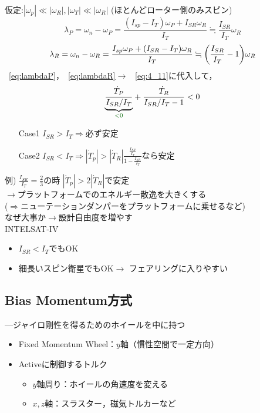 \documentclass[class=article, crop=false, dvipdfmx]{standalone}
\begin{document}
仮定:$|\omega_p|\ll|\omega_R|,|\omega_T|\ll|\omega_R|$
(ほとんどローター側のみスピン)
\begin{equation}
\lambda_P = \omega_n - \omega_P = \frac{(I_{sp} - I_T)\omega_P + I_{SR} \omega_R}{I_T}
	\fallingdotseq \frac{I_{SR}}{I_T} \omega_R
    \label{eq:lambdaP}
\end{equation}
\begin{equation}
\lambda_R = \omega_n - \omega_R = \frac{I_{sp} \omega_P + (I_{SR} - I_T) \omega_R}{I_T}
	\fallingdotseq \qty(\frac{I_{SR}}{I_T} - 1) \omega_R
    \label{eq:lambdaR}
\end{equation}
~\eqref{eq:lambdaP}，~\eqref{eq:lambdaR}$\rightarrow$ ~\eqref{eq:4_11}に代入して，
\begin{equation}
\underexpl{\dfrac{\dot{T}_P}{I_{SR}/I_T}}{\textcolor{darkgreen}{<0}} + \dfrac{\dot{T}_R}{I_{SR}/I_T - 1} < 0
\label{eq:Tdot-relation}
\end{equation}
\begin{itemize}
\item [Case1] $I_{SR}>I_T\Rightarrow$必ず安定
\item [Case2] $I_{SR}<I_{T}
\Rightarrow|\dot{T}_p|>|\dot{T}_R|
\frac{\frac{I_{SR}}{I_T}}{1-\frac{I_{SR}}{I_T}}$なら安定
\end{itemize}
例)
$\frac{I_{SR}}{I_T}=\frac{2}{3}$の時
\qquad
$|\dot{T}_p|>2|\dot{T}_R|$で安定\\
$\rightarrow$プラットフォームでのエネルギー散逸を大きくする\\
($\Rightarrow$ニューテーションダンパーをプラットフォームに乗せるなど)\\
なぜ大事か$\rightarrow$設計自由度を増やす\\


INTELSAT-IV%

\begin{itemize}
\item $I_{SR}<I_T$でもOK
\item 細長いスピン衛星でもOK$\rightarrow$
フェアリングに入りやすい
\end{itemize}

%


\subsection{Bias Momentum方式}
\qquad ---ジャイロ剛性を得るためのホイールを中に持つ

\begin{itemize}
\item Fixed Momentum Wheel：$y$軸（慣性空間で一定方向）
\item Activeに制御するトルク
	\begin{itemize}
    \item $y$軸周り：ホイールの角速度を変える
    \item $x, z$軸：スラスター，磁気トルカーなど
    \end{itemize}
\end{itemize}
\end{document}
